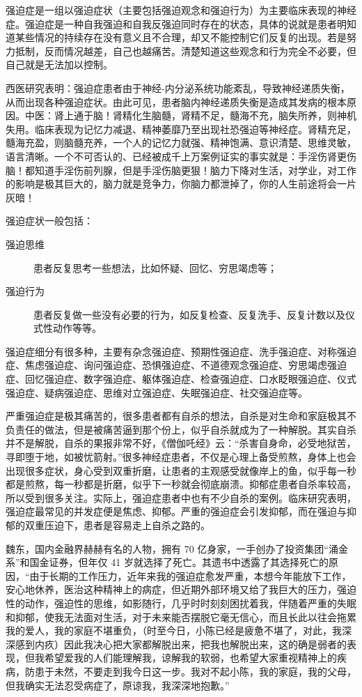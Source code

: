 强迫症是一组以强迫症状（主要包括强迫观念和强迫行为）为主要临床表现的神经症。强迫症是一种自我强迫和自我反强迫同时存在的状态，具体的说就是患者明知道某些情况的持续存在没有意义且不合理，却又不能控制它们反复的出现。若是努力抵制，反而情况越差，自己也越痛苦。清楚知道这些观念和行为完全不必要，但自己就是无法加以控制。

西医研究表明：强迫症患者由于神经-内分泌系统功能紊乱，导致神经递质失衡，从而出现各种强迫症状。由此可见，患者脑内神经递质失衡是造成其发病的根本原因。中医：肾上通于脑！肾精化生脑髓，肾精不足，髓海不充，脑失所养，则神机失用。临床表现为记忆力减退、精神萎靡乃至出现社恐强迫等神经症。肾精充足，髓海充盈，则脑髓充养，一个人的记忆力就强、精神饱满、意识清楚、思维灵敏，语言清晰。一个不可否认的、已经被成千上万案例证实的事实就是：手淫伤肾更伤脑！都知道手淫伤前列腺，但是手淫伤脑更狠！脑力下降对生活，对学业，对工作的影响是极其巨大的，脑力就是竞争力，你脑力都泄掉了，你的人生前途将会一片灰暗！

强迫症状一般包括：

\begin{description}
    \item[强迫思维] 患者反复思考一些想法，比如怀疑、回忆、穷思竭虑等；
    \item[强迫行为] 患者反复做一些没有必要的行为，如反复检查、反复洗手、反复计数以及仪式性动作等等。
\end{description}

强迫症细分有很多种，主要有杂念强迫症、预期性强迫症、洗手强迫症、对称强迫症、焦虑强迫症、询问强迫症、恐惧强迫症、不道德观念强迫症、穷思竭虑强迫症、回忆强迫症、数字强迫症、躯体强迫症、检查强迫症、口水眨眼强迫症、仪式强迫症、疑病强迫症、思维对立强迫症、失眠强迫症、社交强迫症等。

严重强迫症是极其痛苦的，很多患者都有自杀的想法，自杀是对生命和家庭极其不负责任的做法，但是被痛苦逼到那个份上，似乎自杀就成为了一种解脱。其实自杀并不是解脱，自杀的果报非常不好，《僧伽吒经》云：“杀害自身命，必受地狱苦，寻即堕于地，如被忧箭射。”很多神经症患者，不仅是心理上备受煎熬，身体上也会出现很多症状，身心受到双重折磨，让患者的主观感受就像岸上的鱼，似乎每一秒都是煎熬，每一秒都是折磨，似乎下一秒就会彻底崩溃。抑郁症患者自杀率较高，所以受到很多关注。实际上，强迫症患者中也有不少自杀的案例。临床研究表明，强迫症最常见的并发症便是焦虑、抑郁。严重的强迫症会引发抑郁，而在强迫与抑郁的双重压迫下，患者是容易走上自杀之路的。

\begin{case}[强迫症]
    魏东，国内金融界赫赫有名的人物，拥有 70 亿身家，一手创办了投资集团“涌金系”和国金证券，但年仅 41 岁就选择了死亡。其遗书中透露了其选择死亡的原因，“由于长期的工作压力，近年来我的强迫症愈发严重，本想今年能放下工作，安心地休养，医治这种精神上的病症，但近期外部环境又给了我巨大的压力，强迫性的动作，强迫性的思维，如影随行，几乎时时刻刻困扰着我，伴随着严重的失眠和抑郁，使我无法面对生活，对于未来能否摆脱它毫无信心，而且长此以往会拖累我的爱人，我的家庭不堪重负，（时至今日，小陈已经是疲惫不堪了，对此，我深深感到内疚）因此我决心把大家都解脱出来，把我也解脱出来，这的确是弱者的表现，但我希望爱我的人们能理解我，谅解我的软弱，也希望大家重视精神上的疾病，防患于未然，不要走到我今日这一步。我对不起小陈，我的家庭，我的父母，但我确实无法忍受病症了，原谅我，我深深地抱歉。”
\end{case}

